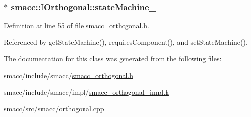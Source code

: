 \subsubsection[{\texorpdfstring{state\+Machine\+\_\+}{stateMachine_}}]{$\ast$ smacc\+::\+I\+Orthogonal\+::state\+Machine\+\_\+\hspace{0.3cm}{\ttfamily [private]}}\hypertarget{classsmacc_1_1IOrthogonal_a6c62a3a971d827d0b2c0b273a49a2129}{}\label{classsmacc_1_1IOrthogonal_a6c62a3a971d827d0b2c0b273a49a2129}


Definition at line 55 of file smacc\+\_\+orthogonal.\+h.



Referenced by get\+State\+Machine(), requires\+Component(), and set\+State\+Machine().



The documentation for this class was generated from the following files\+:\begin{DoxyCompactItemize}
\item 
smacc/include/smacc/\hyperlink{smacc__orthogonal_8h}{smacc\+\_\+orthogonal.\+h}\item 
smacc/include/smacc/impl/\hyperlink{smacc__orthogonal__impl_8h}{smacc\+\_\+orthogonal\+\_\+impl.\+h}\item 
smacc/src/smacc/\hyperlink{orthogonal_8cpp}{orthogonal.\+cpp}\end{DoxyCompactItemize}
